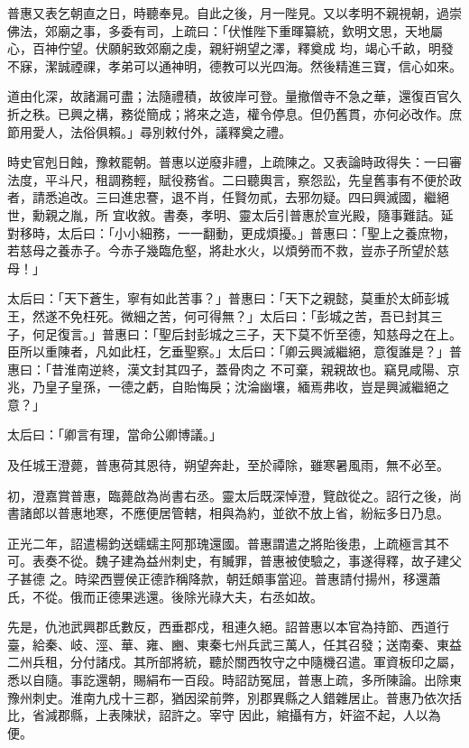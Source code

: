 \begin{pinyinscope}
 普惠又表乞朝直之日，時聽奉見。自此之後，月一陛見。又以孝明不親視朝，過崇佛法，郊廟之事，多委有司，上疏曰：「伏惟陛下重暉纂統，欽明文思，天地屬心，百神佇望。伏願躬致郊廟之虔，親紆朔望之澤，釋奠成
 均，竭心千畝，明發不寐，潔誠禋祼，孝弟可以通神明，德教可以光四海。然後精進三寶，信心如來。



 道由化深，故諸漏可盡；法隨禮積，故彼岸可登。量撤僧寺不急之華，還復百官久折之秩。已興之構，務從簡成；將來之造，權令停息。但仍舊貫，亦何必改作。庶節用愛人，法俗俱賴。」尋別敕付外，議釋奠之禮。



 時史官剋日蝕，豫敕罷朝。普惠以逆廢非禮，上疏陳之。又表論時政得失：一曰審法度，平斗尺，租調務輕，賦役務省。二曰聽輿言，察怨訟，先皇舊事有不便於政者，請悉追改。三曰進忠謇，退不肖，任賢勿貳，去邪勿疑。四曰興滅國，繼絕世，勳親之胤，所
 宜收敘。書奏，孝明、靈太后引普惠於宣光殿，隨事難詰。延對移時，太后曰：「小小細務，一一翻動，更成煩擾。」普惠曰：「聖上之養庶物，若慈母之養赤子。今赤子幾臨危壑，將赴水火，以煩勞而不救，豈赤子所望於慈母！」



 太后曰：「天下蒼生，寧有如此苦事？」普惠曰：「天下之親懿，莫重於太師彭城王，然遂不免枉死。微細之苦，何可得無？」太后曰：「彭城之苦，吾已封其三子，何足復言。」普惠曰：「聖后封彭城之三子，天下莫不忻至德，知慈母之在上。臣所以重陳者，凡如此枉，乞垂聖察。」太后曰：「卿云興滅繼絕，意復誰是？」普惠曰：「昔淮南逆終，漢文封其四子，蓋骨肉之
 不可棄，親親故也。竊見咸陽、京兆，乃皇子皇孫，一德之虧，自貽悔戾；沈淪幽壤，緬焉弗收，豈是興滅繼絕之意？」



 太后曰：「卿言有理，當命公卿博議。」



 及任城王澄薨，普惠荷其恩待，朔望奔赴，至於禫除，雖寒暑風雨，無不必至。



 初，澄嘉賞普惠，臨薨啟為尚書右丞。靈太后既深悼澄，覽啟從之。詔行之後，尚書諸郎以普惠地寒，不應便居管轄，相與為約，並欲不放上省，紛紜多日乃息。



 正光二年，詔遣楊鈞送蠕蠕主阿那瑰還國。普惠謂遣之將貽後患，上疏極言其不可。表奏不從。魏子建為益州刺史，有贓罪，普惠被使驗之，事遂得釋，故子建父子甚德
 之。時梁西豐侯正德詐稱降款，朝廷頗事當迎。普惠請付揚州，移還蕭氏，不從。俄而正德果逃還。後除光祿大夫，右丞如故。



 先是，仇池武興郡氐數反，西垂郡戍，租連久絕。詔普惠以本官為持節、西道行臺，給秦、岐、涇、華、雍、豳、東秦七州兵武三萬人，任其召發；送南秦、東益二州兵租，分付諸戍。其所部將統，聽於關西牧守之中隨機召遣。軍資板印之屬，悉以自隨。事訖還朝，賜絹布一百段。時詔訪冤屈，普惠上疏，多所陳論。出除東豫州刺史。淮南九戍十三郡，猶因梁前弊，別郡異縣之人錯雜居止。普惠乃依次括比，省減郡縣，上表陳狀，詔許之。宰守
 因此，綰攝有方，奸盜不起，人以為便。




\end{pinyinscope}
